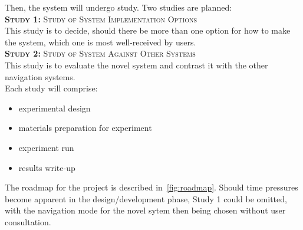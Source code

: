 \documentclass[a4paper, 11pt]{article}
\begin{document}
Then, the system will undergo study. Two studies are planned:~\\
\textsc{\textbf{Study 1:} Study of System Implementation Options}~\\
This study is to decide, should there be more than one option for how to make the system, which one is most well-received by users.~\\
\textsc{\textbf{Study 2:} Study of System Against Other Systems}~\\
This study is to evaluate the novel system and contrast it with the other navigation systems.~\\

Each study will comprise:

\begin{itemize}
\item experimental design
\item materials preparation for experiment
\item experiment run
\item results write-up
\end{itemize}

The roadmap for the project is described in~\cref{fig:roadmap}.
Should time pressures become apparent in the design/development phase, Study 1 could be omitted, with the navigation mode for the novel sytem then being chosen without user consultation.
\end{document}
